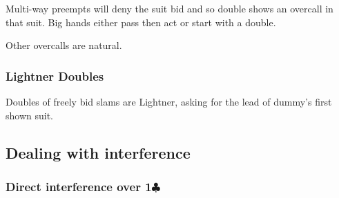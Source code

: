 \documentclass[a4paper,14pt]{extarticle}
\begin{document}
Multi-way preempts will deny the suit bid and so double shows an overcall in
that suit. Big hands either pass then act or start with a double.

Other overcalls are natural.

\subsubsection{Lightner Doubles}
\label{sec:def:lightner}

Doubles of freely bid slams are Lightner, asking for the lead of dummy's first shown suit.

\subsection{Dealing with interference}
\label{sec:interference}

\subsubsection{Direct interference over 1$\clubsuit$}
\label{sec:intf:1c}
\end{document}
